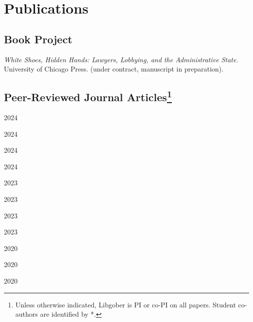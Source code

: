 \documentclass[12pt,letterpaper]{report}
\newcounter{pubcount}
\newcommand{\countthis}{%
}
\begin{document}
    \section*{Publications}

	
	\subsection*{Book Project}
	\textit{White Shoes, Hidden Hands: Lawyers, Lobbying, and the Administrative State}. University of Chicago Press. (under contract, manuscript in preparation). 
 
    \subsection*{Peer-Reviewed Journal Articles\footnote[2]{Unless otherwise indicated, Libgober is PI or co-PI on all papers. Student co-authors are identified by *.}}
    \begin{tablist}
    \item[2024] \tab{}\countthis{}
    \item[2024] \tab{}\countthis{}
    \item[2024] \tab{}\countthis{}
    \item[2024] \tab{}\countthis{}
    \item[2023] \tab{}\countthis{}
    \item[2023]	\tab{}\countthis{}
    \item[2023] \tab{}\countthis{}
    \item[2023] \tab{}\countthis{}
    \item[2020] \tab{}\countthis{}
    \item[2020] \tab{}\countthis{}
    \item[2020] \tab{}\countthis{}
    \end{tablist}
    

    
\end{document}
